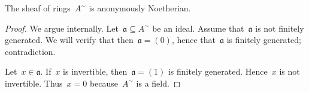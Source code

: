 \documentclass{ws-rv9x6}
\newtheorem{ex}{Exercise}
\newcommand{\NN}{\mathbb{N}}
\newcommand{\ZZ}{\mathbb{Z}}
\newcommand{\aaa}{\mathfrak{a}}
\renewcommand{\_}{\mathpunct{.}}
\newcommand{\?}{\,{:}\,}
\newcommand{\notnot}{\emph{not not}\xspace}
\begin{document}
%
%

\begin{proposition}The sheaf of rings~$A^\sim$ is anonymously
Noetherian.\end{proposition}

\begin{proof}We argue internally. Let~$\aaa \subseteq A^\sim$ be an ideal.
Assume that~$\aaa$ is not finitely generated. We will verify that then~$\aaa =
(0)$, hence that~$\aaa$ is finitely generated; contradiction.

Let~$x \in \aaa$. If~$x$ is invertible, then~$\aaa = (1)$ is finitely
generated. Hence~$x$ is not invertible. Thus~$x = 0$ because~$A^\sim$ is a
field.
\end{proof}
\end{document}
